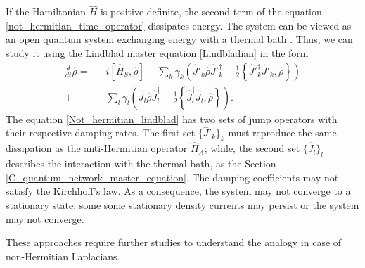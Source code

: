 If the Hamiltonian $\hat H$ is positive definite, the second term of the equation \eqref{not_hermitian_time_operator} dissipates energy. 
The system can be viewed as an open quantum system exchanging energy with a thermal bath \cite{Korsch_2019}. Thus, we can study it using the Lindblad master equation \eqref{Lindbladian} in the form
\begin{equation}\label{Not_hermitian_lindblad}
    \begin{split}
        \frac{d}{dt}\hat\rho = -&i\left[\hat H_S,\hat\rho\right] + \sum_k \gamma_k \left(\hat J'_k \hat\rho \hat J'^\dagger_k - \frac{1}{2}\left\{ \hat J'^\dagger_k\hat J'_k, \hat\rho\right\} \right)\\
        +& \sum_l \gamma_l \left(\hat J_l \hat\rho \hat J^\dagger_l - \frac{1}{2}\left\{ \hat J^\dagger_l\hat J_l, \hat\rho\right\} \right).
    \end{split}
\end{equation}
The equation \eqref{Not_hermitian_lindblad} has two sets of jump operators with their respective damping rates. The first set $\{\hat J'_k\}_k$ must reproduce the same dissipation as the anti-Hermitian operator $\hat H_A$; while, the second set $\{\hat J_l\}_l$ describes the interaction with the thermal bath, as the Section \eqref{C_quantum_network_master_equation}.
The damping coefficients may not satisfy the Kirchhoff's law. As a consequence, the system may not converge to a stationary state; some some stationary density currents may persist or the system may not converge.

These approaches require further studies to understand the analogy in case of non-Hermitian Laplacians.

